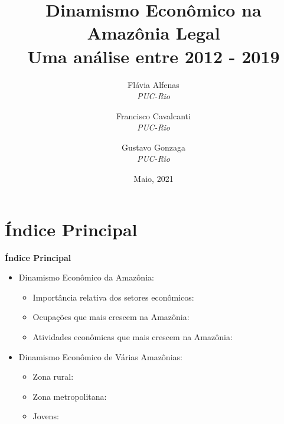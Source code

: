 \documentclass[8pt]{beamer}
\author{
Flávia  Alfenas\\
\textit{PUC-Rio}\\ \vspace{3mm}
\and  
Francisco Cavalcanti\\
\textit{PUC-Rio}\\ \vspace{3mm}
\and   
Gustavo Gonzaga \\
\textit{PUC-Rio} 
}
\date{Maio, 2021}
\title{Dinamismo Econômico na Amazônia Legal \\ Uma análise entre 2012 - 2019}
\begin{document}

\begin{frame}
\titlepage
\end{frame}


\section{Índice Principal}

\begin{frame}[label=indice_principal]{}

\textbf{Índice Principal}
\vspace{1mm}
\begin{itemize}

\item{Dinamismo Econômico da Amazônia:
	\begin{itemize}
	\item{Importância relativa dos setores econômicos:  \hyperlink{_importancia_relativa}{}}
	\vspace{1mm}
	\item{Ocupações que mais crescem na Amazônia:  	\hyperlink{amzcod2dig}{}}
	\vspace{1mm}
	\item{Atividades econômicas que mais crescem na Amazônia:  	\hyperlink{amzcnae2dig}{}}
	\end{itemize}
}

\vspace{1mm}

\item{Dinamismo Econômico de Várias Amazônias:
	\begin{itemize}
	\item{Zona rural:  	\hyperlink{amzruralcod2dig}{}}
	\vspace{1mm}
	\item{Zona metropolitana: 	\hyperlink{amzmetropolitanacod2dig}{}}
	\vspace{1mm}
	\item{Jovens:   	\hyperlink{amzjovemcod2dig}{}}
	\end{itemize}
}


\end{itemize}
\end{frame}
\end{document}
